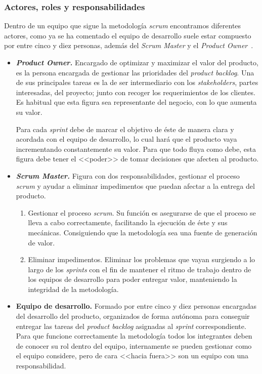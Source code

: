 \subsubsection{Actores, roles y responsabilidades}
Dentro de un equipo que sigue la metodología \textit{scrum} encontramos diferentes actores, como ya se ha comentado el equipo de desarrollo suele estar compuesto por entre cinco y diez personas, además del \textit{Scrum Master} y el \textit{Product Owner}~\cite{julioroche_2020}.
\begin{itemize}
\item \textbf{\textit{Product Owner.}} Encargado de optimizar y maximizar el valor del producto, es la persona encargada de gestionar las prioridades del \textit{product backlog}. Una de sus principales tareas es la de ser intermediario con los \textit{stakeholders}, partes interesadas, del proyecto; junto con recoger los requerimientos de los clientes. Es habitual que esta figura sea representante del negocio, con lo que aumenta su valor.

Para cada \textit{sprint} debe de marcar el objetivo de éste de manera clara y acordada con el equipo de desarrollo, lo cual hará que el producto vaya incrementando constantemente su valor. Para que todo fluya como debe, esta figura debe tener el <<poder>> de tomar decisiones que afecten al producto.

\item \textbf{\textit{Scrum Master.}} Figura con dos responsabilidades, gestionar el proceso \textit{scrum} y ayudar a eliminar impedimentos que puedan afectar a la entrega del producto.
\begin{enumerate}
\item Gestionar el proceso \textit{scrum}. Su función es asegurarse de que el proceso se lleva a cabo correctamente, facilitando la ejecución de éste y sus mecánicas. Consiguiendo que la metodología sea una fuente de generación de valor.
\item Eliminar impedimentos. Eliminar los problemas que vayan surgiendo a lo largo de los \textit{sprints} con el fin de mantener el ritmo de trabajo dentro de los equipos de desarrollo para poder entregar valor, manteniendo la integridad de la metodología.
\end{enumerate}
\item \textbf{Equipo de desarrollo.} Formado por entre cinco y diez personas encargadas del desarrollo del producto, organizados de forma autónoma para conseguir entregar las tareas del \textit{product backlog} asignadas al \textit{sprint} correspondiente. Para que funcione correctamente la metodología todos los integrantes deben de conocer su rol dentro del equipo, internamente se pueden gestionar como el equipo considere, pero de cara <<hacia fuera>> son un equipo con una responsabilidad.
\end{itemize}
\newpage
